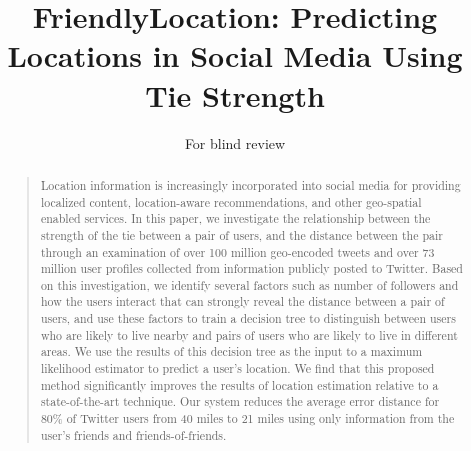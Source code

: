\documentclass[letterpaper]{article}
\begin{document}
\title{FriendlyLocation: Predicting Locations in Social Media Using Tie Strength}
\author{For blind review}
\maketitle
\begin{abstract}
\begin{quote}
%
Location information is increasingly incorporated into social media for
providing localized content, location-aware recommendations, and other
geo-spatial enabled services.
%
In this paper, we investigate the relationship between the strength of the tie
between a pair of users, and the distance between the pair through an
examination of over 100 million geo-encoded tweets and
over 73 million user profiles collected from information publicly
posted to Twitter.
%
Based on this investigation, we identify several factors such as number of
followers and how the users interact that can strongly reveal the distance
between a pair of users, and use these factors to train a decision tree to
distinguish between users who are likely to live nearby and pairs of users who
are likely to live in different areas.
%
We use the results of this decision tree as the input to a maximum likelihood
estimator to predict a user's location.
%
We find that this proposed method significantly improves the results of
location estimation relative to a state-of-the-art technique.
%
Our system reduces the average error distance for 80\% of Twitter users from 40
miles to 21 miles using only information from the user's friends and
friends-of-friends.
\end{quote}
\end{abstract}










\end{document}
